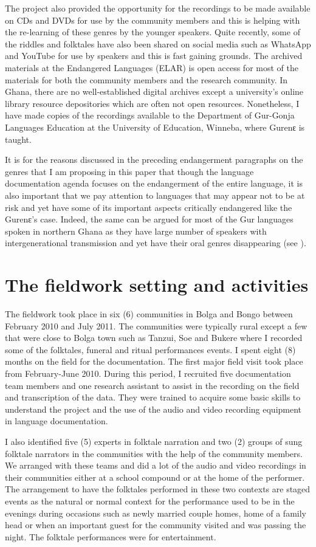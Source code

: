 \documentclass[output=paper,colorlinks,citecolor=brown]{langscibook}
\begin{document}
The project also provided the opportunity for the recordings to be made available on CDs and DVDs for use by the community members and this is helping with the re-learning of these genres by the younger speakers. Quite recently, some of the riddles and folktales have also been shared on social media such as WhatsApp and YouTube for use by speakers and this is fast gaining grounds. The archived materials at the Endangered Languages (ELAR) is open access for most of the materials for both the community members and the research community. In Ghana, there are no well-established digital archives except a university’s online library resource depositories which are often not open resources. Nonetheless, I have made copies of the recordings available to the Department of Gur-Gonja Languages Education at the University of Education, Winneba, where Gurenԑ is taught.

It is for the reasons discussed in the preceding endangerment paragraphs on the genres that  
I am proposing in this paper that though the language documentation agenda focuses on the endangerment of the entire language, it is also important that we pay attention to languages that may appear not to be at risk and yet have some of its important aspects critically endangered like the Gurenɛ’s case. Indeed, the same can be argued for most of the Gur languages spoken in northern Ghana as they have large number of speakers with intergenerational transmission and yet have their oral genres disappearing (see \citealt{Bodomo2004, Bodomo2020}).

\section{The fieldwork setting and activities}
The fieldwork took place in six (6) communities in Bolga and Bongo between February 2010 and July 2011. The communities were typically rural except a few that were close to Bolga town such as Tanzui, Soe and Bukere where I recorded some of the folktales, funeral and ritual performances events. I spent eight (8) months on the field for the documentation. The first major field visit took place from February-June 2010. During this period, I recruited five documentation team members and one research assistant to assist in the recording on the field and transcription of the data. They were trained to acquire some basic skills to understand the project and the use of the audio and video recording equipment in language documentation. 

I also identified five (5) experts in folktale narration and two (2) groups of sung folktale narrators in the communities with the help of the community members. We arranged with these teams and did a lot of the audio and video recordings in their communities either at a school compound or at the home of the performer. The arrangement to have the folktales performed in these two contexts are staged events as the natural or normal context for the performance used to be in the evenings during occasions such as newly married couple homes, home of a family head or when an important guest for the community visited and was passing the night. The folktale performances were for entertainment.  
\end{document}
